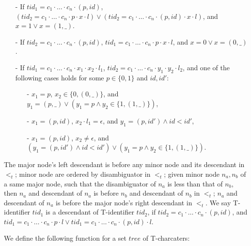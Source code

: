 \begin{itemize}
\setlength{\itemsep}{0.5pt}
\item[-] If $tid_1 = c_1 \cdot \ldots \cdot c_n \cdot (p,id)$, $(tid_2 = c_1 \cdot \ldots \cdot c_n \cdot p \cdot x \cdot l) \vee (tid_2 = c_1 \cdot \ldots \cdot c_n \cdot (p,id) \cdot x \cdot l)$, and $x=1 \vee x=(1,\_)$.

\item[-] If $tid_2 = c_1 \cdot \ldots \cdot c_n \cdot (p,id)$, $tid_1 = c_1 \cdot \ldots \cdot c_n \cdot p \cdot x \cdot l$, and $x=0 \vee x=(0,\_)$.

\item[-] If $tid_1 = c_1 \cdot \ldots \cdot c_n \cdot x_1 \cdot x_2 \cdot l_1$, $tid_2 = c_1 \cdot \ldots \cdot c_n \cdot y_1 \cdot y_2 \cdot l_2$, and one of the following cases holds for some $p \in \{ 0,1 \}$ and $id,id'$:

    \begin{itemize}
    \setlength{\itemsep}{0.5pt}
    \item[-] $x_1=p$, $x_2 \in \{ 0, (0,\_) \}$, and $y_1=(p,\_) \vee (y_1=p \wedge y_2 \in \{ 1, (1,\_) \} )$,

    \item[-] $x_1=(p,id)$, $x_2 \cdot l_1 = \epsilon$, %
        and $y_1 = (p,id') \wedge id<id'$,

    \item[-] $x_1=(p,id)$, $x_2 \neq \epsilon$, and $(y_1 = (p,id') \wedge id<id') \vee (y_1=p \wedge y_2 \in \{ 1, (1,\_) \})$.
    \end{itemize}
\end{itemize}

The major node's left descendant is before any minor node and its descendant in $<_t$; minor node are ordered by disambiguator in $<_t$; given minor node $n_a,n_b$ of a same major node, such that the disambiguator of $n_a$ is less than that of $n_b$, then $n_a$ and descendant of $n_a$ is before $n_b$ and descendant of $n_b$ in $<_t$; $n_a$ and descendant of $n_a$ is before the major node's right descendant in $<_t$. We say T-identifier $tid_1$ is a descendant of T-identifier $tid_2$, if $tid_2 = c_1 \cdot \ldots \cdot c_n \cdot (p,id)$, and $tid_1 = c_1 \cdot \ldots \cdot c_n \cdot p \cdot l \vee tid_1 = c_1 \cdot \ldots \cdot c_n \cdot (p,id) \cdot l$.

We define the following function for a set $tree$ of T-charcaters:

